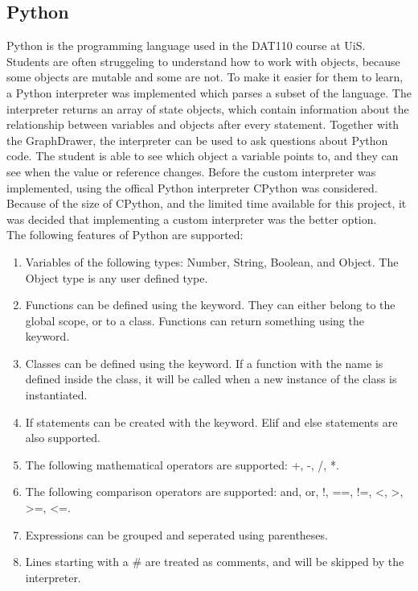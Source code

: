 \subsection{Python}
Python is the programming language used in the DAT110 course at UiS. Students are often struggeling to understand how to work with objects, because some objects are mutable and some are not. To make it easier for them to learn, a Python interpreter was implemented which parses a subset of the language. The interpreter returns an array of state objects, which contain information about the relationship between variables and objects after every statement. Together with the GraphDrawer, the interpreter can be used to ask questions about Python code. The student is able to see which object a variable points to, and they can see when the value or reference changes. Before the custom interpreter was implemented, using the offical Python interpreter CPython was considered. Because of the size of CPython, and the limited time available for this project, it was decided that implementing a custom interpreter was the better option.
\\[11pt]
The following features of Python are supported:
\begin{enumerate}
    \item Variables of the following types: Number, String, Boolean, and Object. The Object type is any user defined type.
    \item Functions can be defined using the  keyword. They can either belong to the global scope, or to a class. Functions can return something using the  keyword.
    \item Classes can be defined using the  keyword. If a function with the  name is defined inside the class, it will be called when a new instance of the class is instantiated.
    \item If statements can be created with the  keyword. Elif and else statements are also supported.
    \item The following mathematical operators are supported: +, -, /, *.
    \item The following comparison operators are supported: and, or, !, ==, !=, <, >, >=, <=.
    \item Expressions can be grouped and seperated using parentheses.
    \item Lines starting with a \# are treated as comments, and will be skipped by the interpreter.
\end{enumerate}
